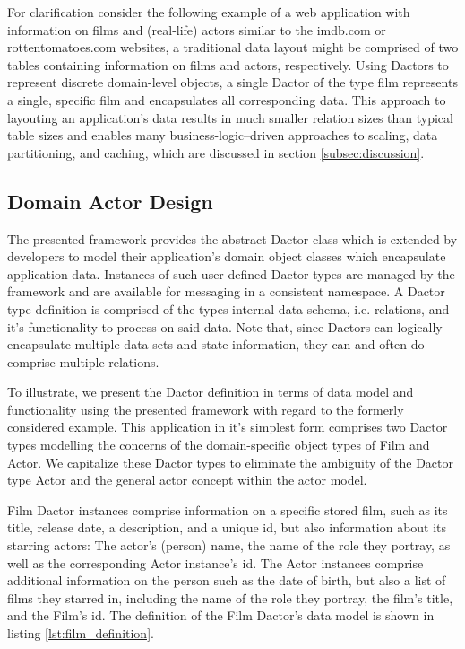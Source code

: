 For clarification consider the following example of a web application with information on films and (real-life) actors similar to the imdb.com or rottentomatoes.com websites, a traditional data layout might be comprised of two tables containing information on films and actors, respectively.
Using Dactors to represent discrete domain-level objects, a single Dactor of the type film represents a single, specific film and encapsulates all corresponding data.
This approach to layouting an application's data results in much smaller relation sizes than typical table sizes and enables many business-logic--driven approaches to scaling, data partitioning, and caching, which are discussed in section \ref{subsec:discussion}.

\subsection{Domain Actor Design}\label{subsec:domain_actor_design}

The presented framework provides the abstract Dactor class which is extended by developers to model their application's domain object classes which encapsulate application data.
Instances of such user-defined Dactor types are managed by the framework and are available for messaging in a consistent namespace.
A Dactor type definition is comprised of the types internal data schema, i.e. relations, and it's functionality to process on said data.
Note that, since Dactors can logically encapsulate multiple data sets and state information, they can and often do comprise multiple relations.

To illustrate, we present the Dactor definition in terms of data model and functionality using the presented framework with regard to the formerly considered example.
This application in it's simplest form comprises two Dactor types modelling the concerns of the domain-specific object types of Film and Actor.
We capitalize these Dactor types to eliminate the ambiguity of the Dactor type Actor and the general actor concept within the actor model.

Film Dactor instances comprise information on a specific stored film, such as its title, release date, a description, and a unique id, but also information about its starring actors:
The actor's (person) name, the name of the role they portray, as well as the corresponding Actor instance's id.
The Actor instances comprise additional information on the person such as the date of birth, but also a list of films they starred in, including the name of the role they portray, the film's title, and the Film's id.
The definition of the Film Dactor's data model is shown in listing \ref{lst:film_definition}.

